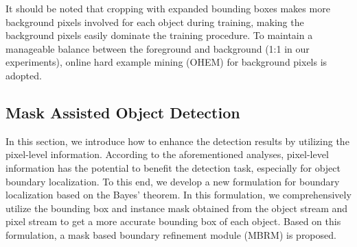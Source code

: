 \documentclass[letterpaper]{article} \usepackage{aaai20}  \usepackage{times}  \usepackage{helvet} \usepackage{courier}  \usepackage[hyphens]{url}  \usepackage{graphicx} \urlstyle{rm} \def\UrlFont{\rm}  \usepackage{graphicx}  \frenchspacing  \setlength{\pdfpagewidth}{8.5in}  \setlength{\pdfpageheight}{11in}
\begin{document}
It should be noted that cropping with expanded bounding boxes makes more background pixels involved for each object during training, making the background pixels easily dominate the training procedure. To maintain a manageable balance between the foreground and background (1:1 in our experiments), online hard example mining (OHEM) \cite{shrivastava2016training}  for background pixels is adopted.

\subsection{Mask Assisted Object Detection}\label{sec:p2o}
In this section, we introduce how to enhance the detection results by utilizing the pixel-level information. According to the aforementioned analyses, pixel-level information has the potential to benefit the detection task, especially for object boundary localization. To this end, we develop a new formulation for boundary localization based on the Bayes' theorem. In this formulation, we comprehensively utilize the bounding box and instance mask obtained from the object stream and pixel stream to get a more accurate bounding box of each object. Based on this formulation, a mask based boundary refinement module (MBRM) is proposed.
\end{document}
